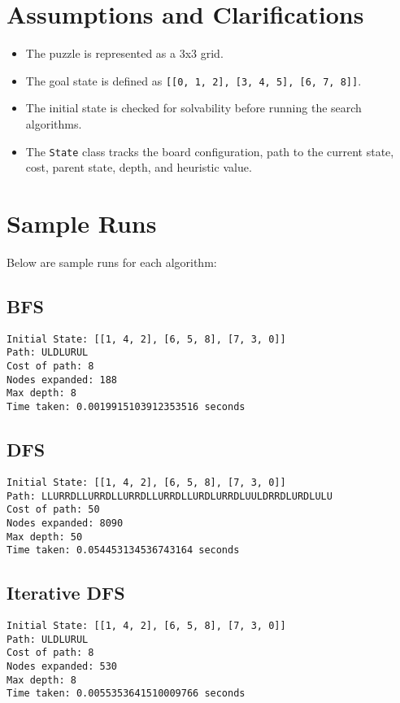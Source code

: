 \documentclass{article}
\begin{document}
\section{Assumptions and Clarifications}
\begin{itemize}
    \item The puzzle is represented as a 3x3 grid.
    \item The goal state is defined as \texttt{[[0, 1, 2], [3, 4, 5], [6, 7, 8]]}.
    \item The initial state is checked for solvability before running the search algorithms.
    \item The \texttt{State} class tracks the board configuration, path to the current state, cost, parent state, depth, and heuristic value.
\end{itemize}

\section{Sample Runs}
Below are sample runs for each algorithm:

\subsection{BFS}
\begin{verbatim}
Initial State: [[1, 4, 2], [6, 5, 8], [7, 3, 0]]
Path: ULDLURUL
Cost of path: 8
Nodes expanded: 188
Max depth: 8
Time taken: 0.0019915103912353516 seconds
\end{verbatim}

\clearpage

\subsection{DFS}
\begin{verbatim}
Initial State: [[1, 4, 2], [6, 5, 8], [7, 3, 0]]
Path: LLURRDLLURRDLLURRDLLURRDLLURDLURRDLUULDRRDLURDLULU
Cost of path: 50
Nodes expanded: 8090
Max depth: 50
Time taken: 0.054453134536743164 seconds
\end{verbatim}

\clearpage

\subsection{Iterative DFS}
\begin{verbatim}
Initial State: [[1, 4, 2], [6, 5, 8], [7, 3, 0]]
Path: ULDLURUL
Cost of path: 8
Nodes expanded: 530
Max depth: 8
Time taken: 0.0055353641510009766 seconds
\end{verbatim}

\clearpage
\end{document}
